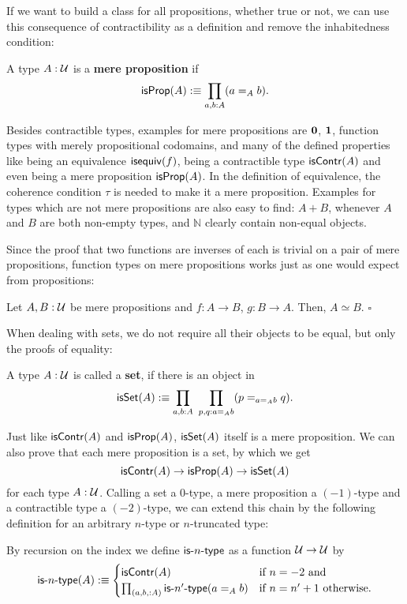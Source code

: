 If we want to build a class for all propositions, whether true or not, we can use
this consequence of contractibility as a definition and remove the inhabitedness
condition:
\begin{defn}
A type $A : \mathcal{U}$ is a \textbf{mere proposition} if
\begin{equation*}
\mathsf{isProp}(A) :\equiv \prod_{a, b : A} (a =_A b) \text{.}
\end{equation*}
\end{defn}

Besides contractible types, examples for mere propositions are $\mathbf{0}$, 
$\mathbf{1}$, function types with merely propositional codomains, and many of the
defined properties like being an equivalence $\mathsf{isequiv}(f)$, being a contractible
type $\mathsf{isContr}(A)$ and even being a mere proposition $\mathsf{isProp}(A)$.
In the definition of equivalence, the coherence condition $\tau$ is needed
to make it a mere proposition.
Examples for types which are not mere propositions are also easy to find:
$A + B$, whenever $A$ and $B$ are both non-empty types, and $\mathbb{N}$ clearly
contain non-equal objects.

Since the proof that two functions are inverses of each is trivial on a pair of
mere propositions, function types on mere propositions works just as one would
expect from propositions:
\begin{lemma}
Let $A, B : \mathcal{U}$ be mere propositions and $f : A \to B$, $g : B \to A$.
Then, $A \simeq B$. \hfill $\square$
\end{lemma}

When dealing with sets, we do not require all their objects to be equal, but
only the proofs of equality:
\begin{defn}[Sets]
A type $A : \mathcal{U}$ is called a \textbf{set}, if there is an object in
\begin{equation*}
\mathsf{isSet}(A) :\equiv \prod_{a, b : A} ~ \prod_{p, q : a =_A b} (p =_{a =_A b} q) \text{.}
\end{equation*}
\end{defn}

Just like $\mathsf{isContr}(A)$ and $\mathsf{isProp}(A)$, $\mathsf{isSet}(A)$ itself is a mere proposition.
We can also prove that each mere proposition is a set, by which we get
\begin{equation*}
\mathsf{isContr}(A) \to \mathsf{isProp}(A) \to \mathsf{isSet}(A)
\end{equation*}
for each type $A : \mathcal{U}$. Calling a set a 0-type, a mere proposition a $(-1)$-type
and a contractible type a $(-2)$-type, we can extend this chain by the following
definition for an arbitrary $n$-type or $n$-truncated type:
\begin{defn}
By recursion on the index we define $\mathsf{is}\mbox{-}{n}\mbox{-}\mathsf{type}$ as a function $\mathcal{U} \to \mathcal{U}$ by
\begin{equation*}
\mathsf{is}\mbox{-}{n}\mbox{-}\mathsf{type}(A) :\equiv \begin{cases}
\mathsf{isContr}(A) & \text{if $n = -2$ and} \\
\prod_{(a, b, : A)} \mathsf{is}\mbox{-}{n'}\mbox{-}\mathsf{type}(a =_A b) & \text{if $n = n' + 1$ otherwise.}
\end{cases}
\end{equation*}
\end{defn}


